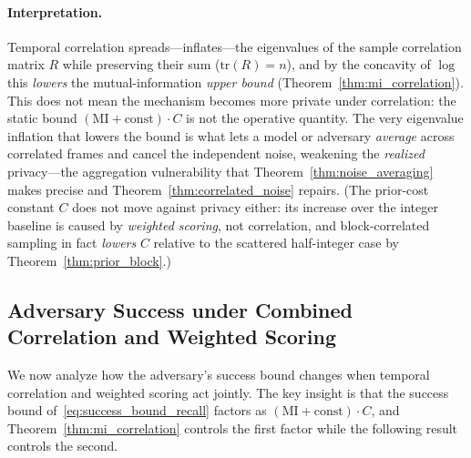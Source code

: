 \documentclass[letterpaper]{article} %
\begin{document}
\paragraph{Interpretation.}
Temporal correlation spreads---inflates---the eigenvalues of the sample
correlation matrix $R$ while preserving their sum ($\mathrm{tr}(R) = n$),
and by the concavity of $\log$ this \emph{lowers} the mutual-information
\emph{upper bound} (Theorem~\ref{thm:mi_correlation}). This does not mean
the mechanism becomes more private under correlation: the static bound
$(\mathrm{MI} + \mathrm{const}) \cdot C$ is not the operative quantity.
The very eigenvalue inflation that lowers the bound is what lets a model
or adversary \emph{average} across correlated frames and cancel the
independent noise, weakening the \emph{realized} privacy---the
aggregation vulnerability that Theorem~\ref{thm:noise_averaging} makes
precise and Theorem~\ref{thm:correlated_noise} repairs. (The prior-cost
constant $C$ does not move against privacy either: its increase over the
integer baseline is caused by \emph{weighted scoring}, not correlation,
and block-correlated sampling in fact \emph{lowers} $C$ relative to the
scattered half-integer case by Theorem~\ref{thm:prior_block}.)

\subsection{Adversary Success under Combined Correlation and Weighted Scoring}

We now analyze how the adversary's success bound changes
when temporal correlation and weighted scoring act jointly.
The key insight is that the success bound
of~\eqref{eq:success_bound_recall} factors as
$(\mathrm{MI} + \mathrm{const}) \cdot C$, and
Theorem~\ref{thm:mi_correlation} controls the first factor
while the following result controls the second.
\end{document}

